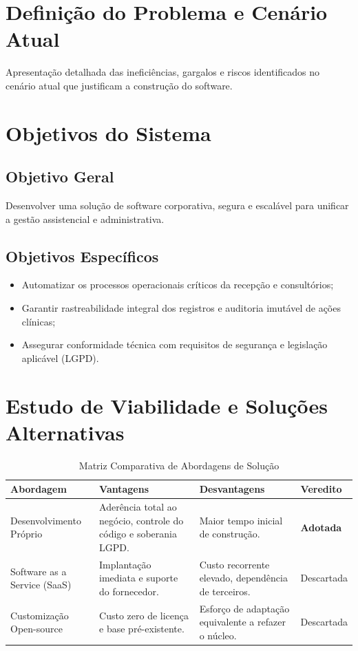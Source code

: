 \section{Definição do Problema e Cenário Atual}
Apresentação detalhada das ineficiências, gargalos e riscos identificados no cenário atual que justificam a construção do software.

\section{Objetivos do Sistema}
\subsection{Objetivo Geral}
Desenvolver uma solução de software corporativa, segura e escalável para unificar a gestão assistencial e administrativa.

\subsection{Objetivos Específicos}
\begin{itemize}
    \item Automatizar os processos operacionais críticos da recepção e consultórios;
    \item Garantir rastreabilidade integral dos registros e auditoria imutável de ações clínicas;
    \item Assegurar conformidade técnica com requisitos de segurança e legislação aplicável (LGPD).
\end{itemize}

\section{Estudo de Viabilidade e Soluções Alternativas}
\begin{table}[htbp]
\caption{Matriz Comparativa de Abordagens de Solução}
\label{tab:comparativo_solucoes}
\centering
\small
\begin{tabularx}{\textwidth}{|l|Y|Y|l|}
\hline
{}
\textbf{Abordagem} & \textbf{Vantagens} & \textbf{Desvantagens} & \textbf{Veredito} \\ \hline
Desenvolvimento Próprio & Aderência total ao negócio, controle do código e soberania LGPD. & Maior tempo inicial de construção. & \textbf{Adotada} \\ \hline
Software as a Service (SaaS) & Implantação imediata e suporte do fornecedor. & Custo recorrente elevado, dependência de terceiros. & Descartada \\ \hline
Customização Open-source & Custo zero de licença e base pré-existente. & Esforço de adaptação equivalente a refazer o núcleo. & Descartada \\ \hline
\end{tabularx}
\end{table}

